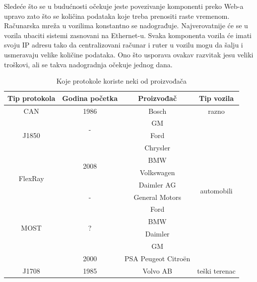 \documentclass[a4paper]{article}
\begin{document}
Sledeće što se u budućnosti očekuje jeste povezivanje komponenti preko Web-a upravo zato što se količina podataka koje treba prenositi raste vremenom. Računarska mreža u vozilima konstantno se nadograđuje. Najverovatnije će se u vozila ubaciti sistemi zasnovani na Ethernet-u. Svaka komponenta vozila će imati svoju IP adresu tako da centralizovani računar i ruter u vozilu mogu da šalju i usmeravaju velike količine podataka. Ono što usporava ovakav razvitak jesu veliki troškovi, ali se takva nadogradnja očekuje jednog dana.

\begin{table}[h!]
\begin{center}
  
\begin{tabular}{ c|c|c|c }
\textbf{Tip protokola} & \textbf{Godina početka} & \textbf{Proizvođač} & \textbf{Tip vozila}\\
\hline
CAN & 1986 & Bosch & razno\\ \hline
\multirow{3}{*}{J1850} & \multirow{2}{*}{-} &  GM & \multirow{12}{*}{automobili} \\
	  & & Ford & \\ \cline{2-3}
             & \multirow{4}{*}{2008} & Chrysler &  \\ \cline{1-1} \cline{3-3}
\multirow{4}{*}{FlexRay}  &    & BMW &  \\
	 		 	 &    & Volkswagen &\\
				 &    & Daimler AG &\\   \cline{2-3}
				 &  - & General Motors &\\ \cline{1-3}
\multirow{4}{*}{MOST} & \multirow{4}{*}{?} & Ford  & \\ 
 &  & BMW & \\ 
 &  & Daimler& \\
 &  &  GM & \\ \cline{1-3}
 & 2000 & PSA Peugeot Citroën & \\ \hline
J1708 & 1985 & Volvo AB & teški terenac \\ \hline


\end{tabular}
\caption{Koje protokole koriste neki od proizvođača}
\label{table:tabela1}
\end{center}
\end{table}
\end{document}
